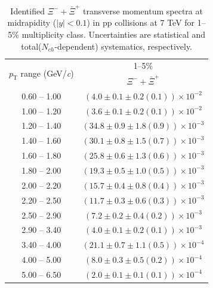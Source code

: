 \begin{table}
\caption{Identified $\Xi^{-} + \bar{\Xi}^{+}$ transverse momentum spectra at midrapidity ($|y|<0.1$) in pp collisions at 7 TeV for 1--5\% multiplicity class. Uncertainties are statistical and total($N_{ch}$-dependent) systematics, respectively.}
\label{tab:XiSum_1to5}
\begin{center}
\begin{tabular}{ c | c }
\hline
\multirow{2}{*}{$p_{\mathrm{T}}$ range (GeV/\textit{c})} & \multicolumn{1}{c}{1--5\%} \\ & $\Xi^{-} + \bar{\Xi}^{+}$\\ 
\hline
0.60 -- 1.00 & $(4.0\pm0.1\pm0.2(0.1))\times10^{-2}$ \\ 
1.00 -- 1.20 & $(3.6\pm0.1\pm0.2(0.1))\times10^{-2}$ \\ 
1.20 -- 1.40 & $(34.8\pm0.9\pm1.8(0.9))\times10^{-3}$ \\ 
1.40 -- 1.60 & $(30.1\pm0.8\pm1.5(0.7))\times10^{-3}$ \\ 
1.60 -- 1.80 & $(25.8\pm0.6\pm1.3(0.6))\times10^{-3}$ \\ 
1.80 -- 2.00 & $(19.3\pm0.5\pm1.0(0.5))\times10^{-3}$ \\ 
2.00 -- 2.20 & $(15.7\pm0.4\pm0.8(0.4))\times10^{-3}$ \\ 
2.20 -- 2.50 & $(11.7\pm0.3\pm0.6(0.3))\times10^{-3}$ \\ 
2.50 -- 2.90 & $(7.2\pm0.2\pm0.4(0.2))\times10^{-3}$ \\ 
2.90 -- 3.40 & $(4.0\pm0.1\pm0.2(0.1))\times10^{-3}$ \\ 
3.40 -- 4.00 & $(21.1\pm0.7\pm1.1(0.5))\times10^{-4}$ \\ 
4.00 -- 5.00 & $(8.0\pm0.3\pm0.5(0.2))\times10^{-4}$ \\ 
5.00 -- 6.50 & $(2.0\pm0.1\pm0.1(0.1))\times10^{-4}$ \\ 
\hline
\end{tabular}
\end{center}
\end{table}
 
